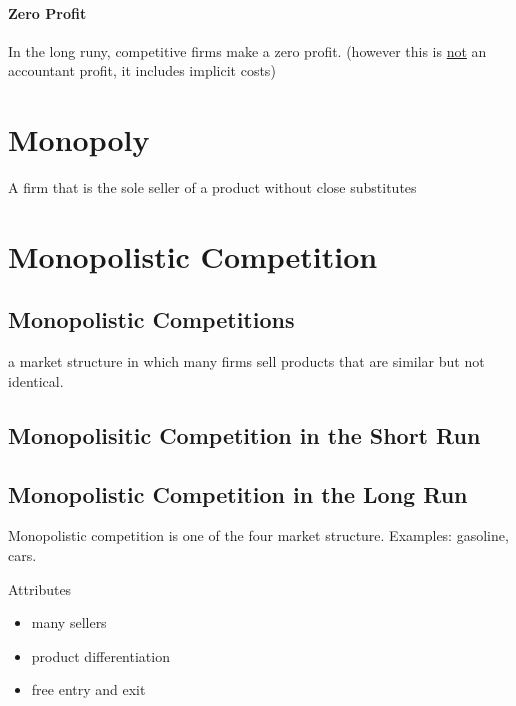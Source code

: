 \documentclass[a4paper,titlepage] {scrartcl}
\begin{document}


\paragraph{Zero Profit} %
\label{par:zero_profit}
In the long runy, competitive firms make a zero profit. (however this is \underline{not} an accountant profit, it includes implicit costs)



\section{Monopoly}
A firm that is the sole seller of a product without close substitutes


\section{Monopolistic Competition}


\subsection{Monopolistic Competitions} %
\label{sub:monopolistic_competitions}
a market structure in which many firms sell products that are similar but not identical.



\subsection{Monopolisitic Competition in the Short Run} %
\label{sub:monopolisitic_competition_in_the_short_run}


\subsection{Monopolistic Competition in the Long Run} %
\label{sub:monopolistic_competition_in_the_long_rub}
Monopolistic competition is one of the four market structure. Examples: gasoline, cars.

Attributes
\begin{itemize}
	\item many sellers
	\item product differentiation
	\item free entry and exit
\end{itemize}
\end{document}
